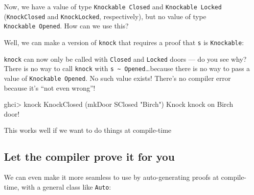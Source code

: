 \documentclass[]{article}
\newenvironment{Shaded}{}{}
\newcommand{\CommentTok}[1]{\textcolor[rgb]{0.38,0.63,0.69}{\textit{#1}}}
\newcommand{\DataTypeTok}[1]{\textcolor[rgb]{0.56,0.13,0.00}{#1}}
\newcommand{\FunctionTok}[1]{\textcolor[rgb]{0.02,0.16,0.49}{#1}}
\newcommand{\NormalTok}[1]{#1}
\newcommand{\OtherTok}[1]{\textcolor[rgb]{0.00,0.44,0.13}{#1}}
\newcommand{\StringTok}[1]{\textcolor[rgb]{0.25,0.44,0.63}{#1}}
\begin{document}
Now, we have a value of type \texttt{Knockable\ \textquotesingle{}Closed} and
\texttt{Knockable\ \textquotesingle{}Locked} (\texttt{KnockClosed} and
\texttt{KnockLocked}, respectively), but no value of type
\texttt{Knockable\ \textquotesingle{}Opened}. How can we use this?

Well, we can make a version of \texttt{knock} that requires a proof that
\texttt{s} is \texttt{Knockable}:

\begin{Shaded}
\end{Shaded}

\texttt{knock} can now only be called with \texttt{Closed} and \texttt{Locked}
doors --- do you see why? There is no way to call \texttt{knock} with
\texttt{s\ \textasciitilde{}\ \textquotesingle{}Opened}\ldots{}because there is
no way to pass a value of \texttt{Knockable\ \textquotesingle{}Opened}. No such
value exists! There's no compiler error because it's ``not even wrong''!

\begin{Shaded}
\begin{Highlighting}[]
\NormalTok{ghci}\FunctionTok{>}\NormalTok{ knock }\DataTypeTok{KnockClosed}\NormalTok{ (mkDoor }\DataTypeTok{SClosed} \StringTok{"Birch"}\NormalTok{)}
\DataTypeTok{Knock}\NormalTok{ knock on }\DataTypeTok{Birch}\NormalTok{ door}\FunctionTok{!}
\end{Highlighting}
\end{Shaded}

This works well if we want to do things at compile-time

\hypertarget{let-the-compiler-prove-it-for-you}{%
\subsection{Let the compiler prove it for
you}\label{let-the-compiler-prove-it-for-you}}

We can even make it more seamless to use by auto-generating proofs at
compile-time, with a general class like \texttt{Auto}:
\end{document}
